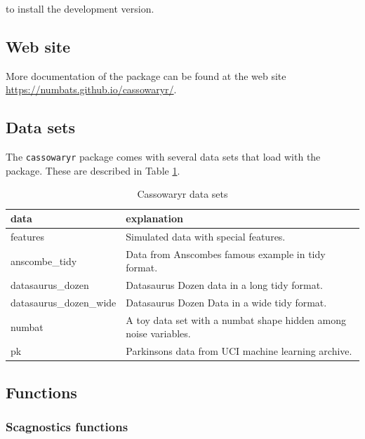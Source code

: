 to install the development version.

\hypertarget{web-site}{%
\subsection{Web site}\label{web-site}}

More documentation of the package can be found at the web site
\url{https://numbats.github.io/cassowaryr/}.

\hypertarget{data-sets}{%
\subsection{Data sets}\label{data-sets}}

The \texttt{cassowaryr} package comes with several data sets that load
with the package. These are described in Table
\ref{tab:datasets-tb-pdf}.

\begin{Schunk}
\begin{table}

\caption{\label{tab:datasets-tb-pdf}Cassowaryr data sets}
\centering
\begin{tabular}[t]{>{\raggedright\arraybackslash}p{4cm}>{\raggedright\arraybackslash}p{8cm}}
\toprule
data & explanation\\
\midrule
features & Simulated data with special features.\\
anscombe\_tidy & Data from Anscombes famous example in tidy format.\\
datasaurus\_dozen & Datasaurus Dozen data in a long tidy format.\\
datasaurus\_dozen\_wide & Datasaurus Dozen Data in a wide tidy format.\\
numbat & A toy data set with a numbat shape hidden among noise variables.\\
\addlinespace
pk & Parkinsons data from UCI machine learning archive.\\
\bottomrule
\end{tabular}
\end{table}

\end{Schunk}

\hypertarget{functions}{%
\subsection{Functions}\label{functions}}

\hypertarget{scagnostics-functions}{%
\subsubsection{Scagnostics functions}\label{scagnostics-functions}}

